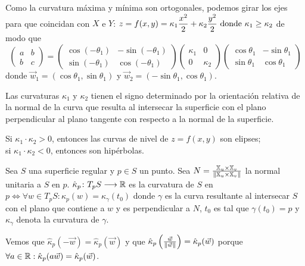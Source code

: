 Como la curvatura máxima y mínima son ortogonales, podemos girar los ejes para que coincidan con $X$ e $Y$: $\displaystyle z = f(x, y) = \kappa_1 \frac{x^2}{2} + \kappa_2 \frac{y^2}{2} \text{ donde } \kappa_1 \geq \kappa_2$ de modo que
\[\begin{pmatrix}
		a & b \\ b & c
	\end{pmatrix} = \begin{pmatrix}
		\cos{(-\theta_1)} & -\sin{(-\theta_1)} \\ \sin{(-\theta_1)} & \cos{(-\theta_1)}
	\end{pmatrix} \begin{pmatrix}
		\kappa_1 & 0 \\ 0 & \kappa_2
	\end{pmatrix} \begin{pmatrix}
		\cos{\theta_1} & -\sin{\theta_1} \\ \sin{\theta_1} & \cos{\theta_1}
	\end{pmatrix}\]
donde $\vec{w}_1 = (\cos{\theta_1}, \sin{\theta_1})$ y $\vec{w}_2 = (-\sin{\theta_1}, \cos{\theta_1})$.

Las curvaturas $\kappa_1$ y $\kappa_2$ tienen el signo determinado por la orientación relativa de la normal de la curva que resulta al intersecar la superficie con el plano perpendicular al plano tangente con respecto a la normal de la superficie.

Si $\kappa_1 \cdot \kappa_2 > 0$, entonces las curvas de nivel de $z=f(x, y)$ son elipses;\\ si $\kappa_1 \cdot \kappa_2 < 0$, entonces son hipérbolas.

\begin{defn}
	Sea $S$ una superficie regular y $p\in S$ un punto. Sea $N = \frac{\mathbb{X}_u \times \mathbb{X}_v}{\left\Vert\mathbb{X}_u \times \mathbb{X}_v\right\Vert}$ la normal unitaria a $S$ en $p$. $\hat{\kappa}_p \colon T_pS \longrightarrow \mathbb{R}$ es la curvatura de $S$ en $p \iff \forall w \in T_pS : \hat{\kappa}_p(w) = \kappa_{\gamma}(t_0)$ donde $\gamma$ es la curva resultante al intersecar $S$ con el plano que contiene a $w$ y es perpendicular a $N$, $t_0$ es tal que $\gamma(t_0) = p$ y $\kappa_{\gamma}$ denota la curvatura de $\gamma$.

	Vemos que $\hat{\kappa}_p(-\vec{w}) = \hat{\kappa}_p(\vec{w})$ y que $\hat{\kappa}_p\left(\frac{\vec{w}}{\left\Vert\vec{w}\right\Vert}\right) = \hat{\kappa}_p(\vec{w})$ porque $\forall a \in \mathbb{R} : \hat{\kappa}_p(a\vec{w}) = \hat{\kappa}_p(\vec{w})$.
\end{defn}


